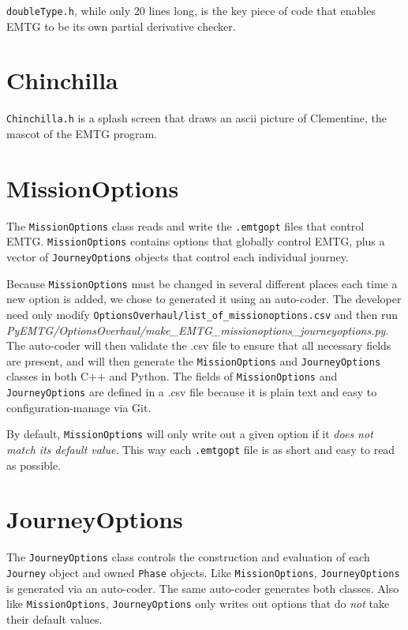 \texttt{doubleType.h}, while only 20 lines long, is the key piece of code that enables EMTG to be its own partial derivative checker.

\section{Chinchilla}
\label{sec:chinchilla}

\texttt{Chinchilla.h} is a splash screen that draws an ascii picture of Clementine, the mascot of the EMTG program.

\section{MissionOptions}
\label{sec:missionoptions}

The \texttt{MissionOptions} class reads and write the \texttt{.emtgopt} files that control EMTG. \texttt{MissionOptions} contains options that globally control EMTG, plus a vector of \texttt{JourneyOptions} objects that control each individual journey.

Because \texttt{MissionOptions} must be changed in several different places each time a new option is added, we chose to generated it using an auto-coder. The developer need only modify \texttt{OptionsOverhaul/list\_of\_missionoptions.csv} and then run \textit{PyEMTG/OptionsOverhaul/make\_EMTG\_missionoptions\_journeyoptions.py}. The auto-coder will then validate the .csv file to ensure that all necessary fields are present, and will then generate the \texttt{MissionOptions} and \texttt{JourneyOptions} classes in both C++ and Python. The fields of \texttt{MissionOptions} and \texttt{JourneyOptions} are defined in a .csv file because it is plain text and easy to configuration-manage via Git.

By default, \texttt{MissionOptions} will only write out a given option if it \textit{does not match its default value}. This way each \texttt{.emtgopt} file is as short and easy to read as possible.

\section{JourneyOptions}
\label{sec:journeyoptions}

The \texttt{JourneyOptions} class controls the construction and evaluation of each \texttt{Journey} object and owned \texttt{Phase} objects. Like \texttt{MissionOptions}, \texttt{JourneyOptions} is generated via an auto-coder. The same auto-coder generates both classes. Also like \texttt{MissionOptions}, \texttt{JourneyOptions} only writes out options that do \textit{not} take their default values.

